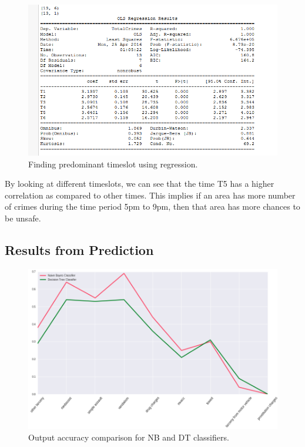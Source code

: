\documentclass[journal, a4paper]{IEEEtran}
\begin{document}
    \begin{figure}[!hbt]
        \begin{center}
        \includegraphics[width=\columnwidth]{regression-timeslot.png}
        \caption{Finding predominant timeslot using regression.}
        \label{fig:tf_plot}
        \end{center}
    \end{figure}

By looking at different timeslots, we can see that the time T5 has a higher correlation as compared to other times. This implies if an area has more number of crimes during the time period 5pm to 9pm, then that area has more chances to be unsafe.



\subsection{Results from Prediction}
    \begin{figure}[!hbt]
        \begin{center}
        \includegraphics[width=\columnwidth]{prediction-accuracy.png}
        \caption{Output accuracy comparison for NB and DT classifiers.}
        \label{fig:tf_plot}
        \end{center}
    \end{figure}
\end{document}
